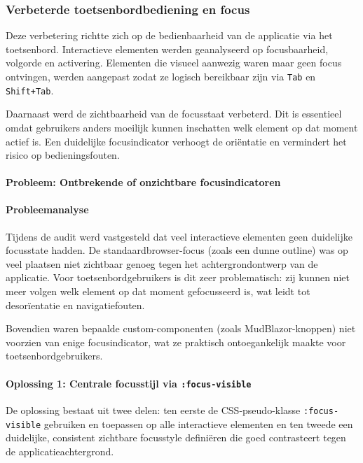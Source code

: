 \subsubsection{Verbeterde toetsenbordbediening en focus}

Deze verbetering richtte zich op de bedienbaarheid van de applicatie via het toetsenbord. Interactieve elementen werden geanalyseerd op focusbaarheid, volgorde en activering. Elementen die visueel aanwezig waren maar geen focus ontvingen, werden aangepast zodat ze logisch bereikbaar zijn via \texttt{Tab} en \texttt{Shift+Tab}.

Daarnaast werd de zichtbaarheid van de focusstaat verbeterd. Dit is essentieel omdat gebruikers anders moeilijk kunnen inschatten welk element op dat moment actief is. Een duidelijke focusindicator verhoogt de oriëntatie en vermindert het risico op bedieningsfouten.

\paragraph{Probleem: Ontbrekende of onzichtbare focusindicatoren}

\paragraph{Probleemanalyse}

Tijdens de audit werd vastgesteld dat veel interactieve elementen geen duidelijke focusstate hadden. De standaardbrowser-focus (zoals een dunne outline) was op veel plaatsen niet zichtbaar genoeg tegen het achtergrondontwerp van de applicatie. Voor toetsenbordgebruikers is dit zeer problematisch: zij kunnen niet meer volgen welk element op dat moment gefocusseerd is, wat leidt tot desorïentatie en navigatiefouten.

Bovendien waren bepaalde custom-componenten (zoals MudBlazor-knoppen) niet voorzien van enige focusindicator, wat ze praktisch ontoegankelijk maakte voor toetsenbordgebruikers.

\paragraph{Oplossing 1: Centrale focusstijl via \texttt{:focus-visible}}

De oplossing bestaat uit twee delen: ten eerste de CSS-pseudo-klasse \texttt{:focus-visible} gebruiken en toepassen op alle interactieve elementen en ten tweede een duidelijke, consistent zichtbare focusstyle definiëren die goed contrasteert tegen de applicatieachtergrond.

